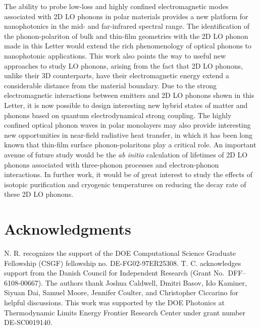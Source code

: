 \documentclass[aps,prb,twocolumn,
	           groupedaddress,superscriptaddress,
               amsfonts,amssymb,amsmath,floatfix,
	           citeautoscript]{revtex4-1}
\begin{document}
The ability to probe low-loss and highly confined electromagnetic modes associated with 2D LO phonons in polar materials provides a new platform for nanophotonics in the mid- and far-infrared spectral range. The identification of the phonon-polariton of bulk and thin-film geometries with the 2D LO phonon made in this Letter would extend the rich phenomenology of optical phonons to nanophotonic applications. This work also points the way to useful new approaches to study LO phonons, arising from the fact that 2D LO phonons, unlike their 3D counterparts, have their electromagnetic energy extend a considerable distance from the material boundary. Due to the strong electromagnetic interactions between emitters and 2D LO phonons shown in this Letter, it is now possible to design interesting new hybrid states of matter and phonons based on quantum electrodynamical strong coupling. The highly confined optical phonon waves in polar monolayers may also provide interesting new opportunities in near-field radiative heat transfer, in which it has been long known that thin-film surface phonon-polaritons play a critical role. An important avenue of future study would be the \textit{ab initio} calculation of lifetimes of 2D LO phonons associated with three-phonon processes and electron-phonon interactions. In further work, it would be of great interest to study the effects of isotopic purification and cryogenic temperatures on reducing the decay rate of these 2D LO phonons.

\section{Acknowledgments}
N. R. recognizes the support of the DOE Computational Science Graduate Fellowship (CSGF) fellowship no. DE-FG02-97ER25308. T. C. acknowledges support from the Danish Council for Independent Research (Grant No.\ DFF--6108-00667). The authors thank Joshua Caldwell, Dmitri Basov, Ido Kaminer, Siyuan Dai, Samuel Moore, Jennifer Coulter, and Christopher Ciccarino for helpful discussions. This work was supported by the DOE Photonics at Thermodynamic Limits Energy Frontier Research Center under grant number DE-SC0019140.





\end{document}
